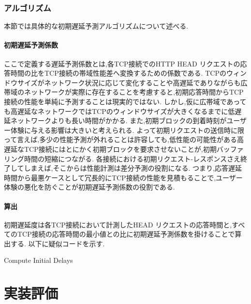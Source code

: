 \documentclass[a4j,12pt]{gradthesis_utf8}
\begin{document}
\newpage

\subsection{アルゴリズム}
\label{yosokuhouhou}
本節では具体的な初期遅延予測アルゴリズムについて述べる.

\subsubsection{初期遅延予測係数}
ここで定義する遅延予測係数とは,各TCP接続でのHTTP HEAD リクエストの応答時間の比をTCP接続の帯域性能差へ変換するための係数である.
TCPのウィンドウサイズがネットワーク状況に応じて変化することや高遅延でありながらも広帯域のネットワークが実際に存在することを考慮すると,初期応答時間からTCP接続の性能を単純に予測することは現実的ではない.
しかし,仮に広帯域であっても高遅延なネットワークではTCPのウィンドウサイズが大きくなるまでに低遅延ネットワークよりも長い時間がかかる.
また,初期ブロックの到着時刻がユーザー体験に与える影響は大きいと考えられる.
よって初期リクエストの送信時に限って言えば,多少の性能予測が外れることは許容しても,低性能の可能性がある高遅延なTCP接続にはとにかく初期ブロックを要求させないことが,初期バッファリング時間の短縮につながる.
各接続における初期リクエスト-レスポンスさえ終了してしまえば,そこからは性能計測は差分予測の役割になる.
つまり,応答遅延時間から最悪ケースとして冗長的にTCP接続の性能を見積もることで,ユーザー体験の悪化を防ぐことが初期遅延予測係数の役割である.

\subsubsection{算出}
初期遅延度は各TCP接続において計測したHEAD リクエストの応答時間と,すべてのTCP接続の応答時間の最小値との比に初期遅延予測係数を掛けることで算出する.
以下に疑似コードを示す.

\begin{algorithm}
	\caption{Compute Initial Delays}
	\begin{algorithmic}[1]
		\EndFor
	\end{algorithmic}
	
\end{algorithm}


\chapter{実装評価}\label{sec:sec4}
\end{document}
